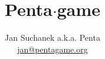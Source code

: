 \documentclass[DIV=19,b5paper,twoside,12pt,spanish,russian,french,ngerman,latin,bahasai,english]{scrartcl}
\title{Penta$\cdot$game}
\author{Jan Suchanek a.k.a. Penta\\ \href{mailto:jan@pentagame.org}{\makeatletter jan@pentagame.org\makeatother} }
\newcommand{\layout}{}
\begin{document}


\newpage




\clearpage


\layout
\pagebreak


\layout
\pagebreak


\layout
\pagebreak


%


\layout
\pagebreak


\layout
\pagebreak


\layout
\pagebreak


\layout
\pagebreak


\layout
\pagebreak

\begin{CJK*}{UTF8}{bkai}

\layout
\end{CJK*}
\pagebreak

\begin{CJK*}{UTF8}{gbsn}

\layout
\end{CJK*}

\end{document}
